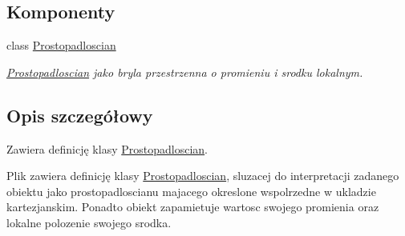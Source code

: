 \subsection*{Komponenty}
\begin{DoxyCompactItemize}
\item 
class \hyperlink{classProstopadloscian}{Prostopadloscian}
\begin{DoxyCompactList}\small\item\em \hyperlink{classProstopadloscian}{Prostopadloscian} jako bryla przestrzenna o promieniu i srodku lokalnym. \end{DoxyCompactList}\end{DoxyCompactItemize}


\subsection{Opis szczegółowy}
Zawiera definicję klasy \hyperlink{classProstopadloscian}{Prostopadloscian}. 

Plik zawiera definicję klasy \hyperlink{classProstopadloscian}{Prostopadloscian}, sluzacej do interpretacji zadanego obiektu jako prostopadloscianu majacego okreslone wspolrzedne w ukladzie kartezjanskim. Ponadto obiekt zapamietuje wartosc swojego promienia oraz lokalne polozenie swojego srodka. 